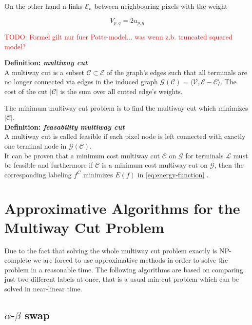 \documentclass{scrartcl}[12pt, halfparskip]
\newcommand{\todo}[1]{\textcolor{red}{TODO: #1}}
\begin{document}
On the other hand n-links $\mathcal{E}_n$ between neighbouring pixels with the weight

\begin{equation}
	V_{p,q} = 2 u_{p,q}
\end{equation}

\todo{Formel gilt nur fuer Potts-model... was wenn z.b. truncated squared model?}

\textbf{Definition: \textit{multiway cut}}\\
A multiway cut is a subset $\mathcal{C} \subset \mathcal{E}$ of the graph's edges such that all terminals are no longer connected via edges in the induced graph $\mathcal{G}(\mathcal{C}) = \langle \mathcal{V}, \mathcal{E} - \mathcal{C}\rangle$. The cost of the cut $|\mathcal{C}|$ is the sum over all cutted edge's weights. 

The minimum multiway cut problem is to find the multiway cut which minimizes $|\mathcal{C}|$. \\

\textbf{Definition: \textit{feasability multiway cut}}\\
A multiway cut is called feasible if each pixel node is left connected with exactly one terminal node in $\mathcal{G}(\mathcal{C})$. \\


It can be proven that a minimum cost multiway cut $\mathcal{C}$ on $\mathcal{G}$ for terminals $\mathcal{L}$ must be feasible \cite{boykov98} and furthermore if $\mathcal{C}$ is a minimum cost multiway cut on $\mathcal{G}$, then the corresponding labeling $f^C$ minimizes $E(f)$ in \eqref{eq:energy-function} \cite{boykov98}.





\section{Approximative Algorithms for the Multiway Cut Problem}
Due to the fact that solving the whole multiway cut problem exactly is NP-complete we are forced to use approximative methods in order to solve the problem in a reasonable time.
The following algorithms are based on comparing just two different labels at once, that is a usual min-cut problem which can be solved in near-linear time.


\subsection{$\alpha$-$\beta$ swap}
\end{document}
